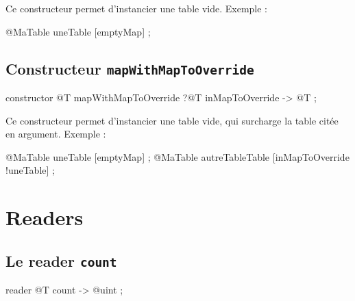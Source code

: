Ce constructeur permet d'instancier une table vide. Exemple :
\begin{galgascode}
@MaTable uneTable [emptyMap] ;
\end{galgascode}

 

\subsection{Constructeur \texttt{mapWithMapToOverride}}

\begin{galgascode}
constructor @T mapWithMapToOverride ?@T inMapToOverride -> @T ;
\end{galgascode}

Ce constructeur permet d'instancier une table vide, qui surcharge la table  citée en argument. Exemple :
\begin{galgascode}
@MaTable uneTable [emptyMap] ;
@MaTable autreTableTable [inMapToOverride !uneTable] ;
\end{galgascode}

\section{Readers}

%
%

\subsection{Le reader \texttt{count}}

\begin{galgascode}
reader @T count -> @uint ;
\end{galgascode}



